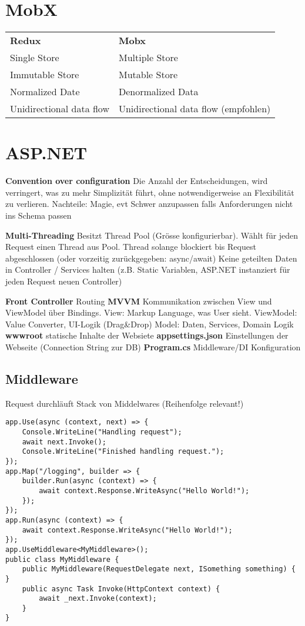 \begin{multicols*}{2}
\section{MobX}
\begin{tabular}{ll}
    \textbf{Redux} & \textbf{Mobx}  \\
    Single Store & Multiple Store \\
    Immutable Store &  Mutable Store\\
    Normalized Date & Denormalized Data \\
    Unidirectional data flow & Unidirectional data flow (empfohlen)
\end{tabular}

\section{ASP.NET}
\textbf{Convention over configuration} Die Anzahl der Entscheidungen, wird verringert, was zu mehr Simplizität führt, ohne notwendigerweise an Flexibilität zu verlieren. Nachteile: Magie, evt Schwer anzupassen falls Anforderungen nicht ins Schema passen

\textbf{Multi-Threading} Besitzt Thread Pool (Grösse konfigurierbar). Wählt für jeden Request einen Thread aus Pool.  Thread solange blockiert bis Request abgeschlossen (oder vorzeitig zurückgegeben: async/await) Keine geteilten Daten in Controller / Services halten (z.B. Static Variablen, ASP.NET instanziert für jeden Request neuen Controller)

\textbf{Front Controller} Routing
\textbf{MVVM} Kommunikation zwischen View und ViewModel über Bindings. View: Markup Language, was User sieht. ViewModel: Value Converter, UI-Logik (Drag\&Drop) Model: Daten, Services, Domain Logik
\textbf{wwwroot} statische Inhalte der Websiete \textbf{appsettings.json} Einstellungen der Webseite (Connection String zur DB) \textbf{Program.cs} Middleware/DI Konfiguration

\subsection{Middleware}
Request durchläuft Stack von Middelwares (Reihenfolge relevant!)

\begin{verbatim}
app.Use(async (context, next) => {
    Console.WriteLine("Handling request");
    await next.Invoke();
    Console.WriteLine("Finished handling request.");
});
app.Map("/logging", builder => {
    builder.Run(async (context) => {
        await context.Response.WriteAsync("Hello World!");
    });
});
app.Run(async (context) => {
    await context.Response.WriteAsync("Hello World!");
});
app.UseMiddleware<MyMiddleware>();
public class MyMiddleware {
    public MyMiddleware(RequestDelegate next, ISomething something) { }
    public async Task Invoke(HttpContext context) {
        await _next.Invoke(context);
    }
}
\end{verbatim}


\end{multicols*}
